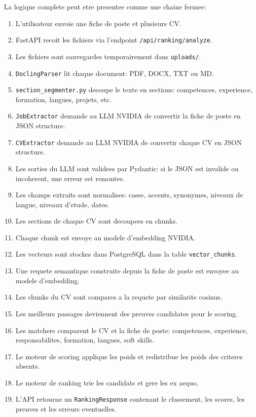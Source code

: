 \documentclass[12pt,a4paper]{article}
\begin{document}
La logique complete peut etre presentee comme une chaine fermee:

\begin{enumerate}
  \item L'utilisateur envoie une fiche de poste et plusieurs CV.
  \item FastAPI recoit les fichiers via l'endpoint \texttt{/api/ranking/analyze}.
  \item Les fichiers sont sauvegardes temporairement dans \texttt{uploads/}.
  \item \texttt{DoclingParser} lit chaque document: PDF, DOCX, TXT ou MD.
  \item \texttt{section\_segmenter.py} decoupe le texte en sections: competences, experience, formation, langues, projets, etc.
  \item \texttt{JobExtractor} demande au LLM NVIDIA de convertir la fiche de poste en JSON structure.
  \item \texttt{CVExtractor} demande au LLM NVIDIA de convertir chaque CV en JSON structure.
  \item Les sorties du LLM sont validees par Pydantic: si le JSON est invalide ou incoherent, une erreur est remontee.
  \item Les champs extraits sont normalises: casse, accents, synonymes, niveaux de langue, niveaux d'etude, dates.
  \item Les sections de chaque CV sont decoupees en chunks.
  \item Chaque chunk est envoye au modele d'embedding NVIDIA.
  \item Les vecteurs sont stockes dans PostgreSQL dans la table \texttt{vector\_chunks}.
  \item Une requete semantique construite depuis la fiche de poste est envoyee au modele d'embedding.
  \item Les chunks du CV sont compares a la requete par similarite cosinus.
  \item Les meilleurs passages deviennent des preuves candidates pour le scoring.
  \item Les matchers comparent le CV et la fiche de poste: competences, experience, responsabilites, formation, langues, soft skills.
  \item Le moteur de scoring applique les poids et redistribue les poids des criteres absents.
  \item Le moteur de ranking trie les candidats et gere les ex aequo.
  \item L'API retourne un \texttt{RankingResponse} contenant le classement, les scores, les preuves et les erreurs eventuelles.
\end{enumerate}
\end{document}
